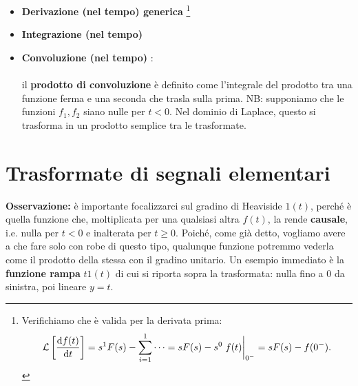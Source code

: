 \begin{itemize}
		\begin{proof}
	Usiamo la definizione di trasformata e applichiamo l'integrazione per parti:
	\begin{align*}
		\lt{\dv{f(t)}{t}} & = \ltint{\dv{f(t)}{t}}{-st}{t}	 = \eval{f(t)e^{-st}}_{0^-}^{\pinf} - \int_{0^-}^{\pinf} f(t)(-s)e^{-st} \dd{t} \\ & = 0 - f(0^-) + \int_{0^-}^{\pinf} sf(t)e^{-st} \dd{t} = - f(0^-) + s \int_{0^-}^{\pinf} f(t)e^{-st} \dd{t} \\ & = - f(0^-) + s \lt{f(t)} = sF(s) - f(0^-).
	\end{align*}
	\end{proof}
	\item \textbf{Derivazione (nel tempo) generica} \rarr {} \footnote{
	Verifichiamo che è valida per la derivata prima:
	\begin{equation*}
		\lt{\dv{f(t)}{t}} = s^1 F(s) - \sum_{i=1}^1 \cdots = s F(s) - s^{0} \eval{f(t)}_{0^-} = sF(s)-f(0^-).
	\end{equation*}}
	\item \textbf{Integrazione (nel tempo)} \rarr {}
\item \textbf{Convoluzione (nel tempo)} \rarr {} : \\ \\ il \textbf{prodotto di convoluzione} è definito come l'integrale del prodotto tra una funzione ferma e una seconda che trasla sulla prima. NB: supponiamo che le funzioni $f_1,f_2$ siano nulle per $t < 0$. Nel dominio di Laplace, questo si trasforma in un prodotto semplice tra le trasformate.
\end{itemize}

\section{Trasformate di segnali elementari}
\begin{minipage}
{0.5\textwidth}
\end{minipage}
\begin{minipage}
{0.5\textwidth}
\end{minipage}
\bb
\textbf{Osservazione:} è importante focalizzarci sul gradino di Heaviside $1(t)$, perché è quella funzione che, moltiplicata per una qualsiasi altra $f(t)$, la rende \textbf{causale}, i.e. nulla per $t < 0$ e inalterata per $t \geq 0$. Poiché, come già detto, vogliamo avere a che fare solo con robe di questo tipo, qualunque funzione potremmo vederla come il prodotto della stessa con il gradino unitario. Un esempio immediato è la \textbf{funzione rampa} $t1(t)$ di cui si riporta sopra la trasformata: nulla fino a $0$ da sinistra, poi lineare $y=t$. 

